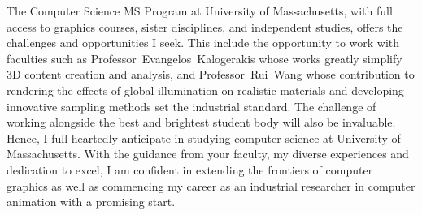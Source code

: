 \documentclass[a4paper, 11pt]{article}
\begin{document}
The Computer Science MS Program at University of Massachusetts, with full access to graphics courses, sister disciplines, and independent studies, offers the challenges and opportunities I seek. This include the opportunity to work with faculties such as \mbox{Professor~Evangelos~Kalogerakis} whose works greatly simplify 3D content creation and analysis, and \mbox{Professor~Rui~Wang} whose contribution to rendering the effects of global illumination on realistic materials and developing innovative sampling methods set the industrial standard. The challenge of working alongside the best and brightest student body will also be invaluable. Hence, I full-heartedly anticipate in studying computer science at University of Massachusetts. With the guidance from your faculty, my diverse experiences and dedication to excel, I am confident in extending the frontiers of computer graphics as well as commencing my career as an industrial researcher in computer animation with a promising start.

\end{document}
